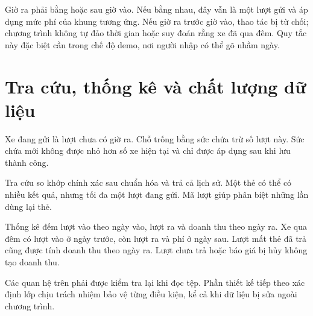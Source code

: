 Giờ ra phải bằng hoặc sau giờ vào. Nếu bằng nhau, đây vẫn là một lượt gửi và áp dụng mức phí của khung tương ứng. Nếu giờ ra trước giờ vào, thao tác bị từ chối; chương trình không tự đảo thời gian hoặc suy đoán rằng xe đã qua đêm. Quy tắc này đặc biệt cần trong chế độ demo, nơi người nhập có thể gõ nhầm ngày.

\section{Tra cứu, thống kê và chất lượng dữ liệu}
Xe đang gửi là lượt chưa có giờ ra. Chỗ trống bằng sức chứa trừ số lượt này. Sức chứa mới không được nhỏ hơn số xe hiện tại và chỉ được áp dụng sau khi lưu thành công.

Tra cứu so khớp chính xác sau chuẩn hóa và trả cả lịch sử. Một thẻ có thể có nhiều kết quả, nhưng tối đa một lượt đang gửi. Mã lượt giúp phân biệt những lần dùng lại thẻ.

Thống kê đếm lượt vào theo ngày vào, lượt ra và doanh thu theo ngày ra. Xe qua đêm có lượt vào ở ngày trước, còn lượt ra và phí ở ngày sau. Lượt mất thẻ đã trả cũng được tính doanh thu theo ngày ra. Lượt chưa trả hoặc báo giá bị hủy không tạo doanh thu.

Các quan hệ trên phải được kiểm tra lại khi đọc tệp. Phần thiết kế tiếp theo xác định lớp chịu trách nhiệm bảo vệ từng điều kiện, kể cả khi dữ liệu bị sửa ngoài chương trình.
